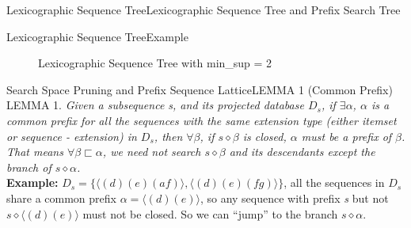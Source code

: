 \documentclass[12pt]{beamer}
\newcommand{\splitline}{\vspace{0.4cm}}
\begin{document}
\begin{frame}{Lexicographic Sequence Tree}{Lexicographic Sequence Tree and Prefix Search Tree}
\end{frame}

\begin{frame}{Lexicographic Sequence Tree}{Example}\label{D-sample}
\begin{figure}
\caption*{Lexicographic Sequence Tree with min\_sup = 2}
\end{figure}
\end{frame}

\begin{frame}{Search Space Pruning and Prefix Sequence Lattice}{LEMMA 1 (Common Prefix)}
LEMMA 1. {\it Given a subsequence s, and its projected database $D_s$, if $\exists\alpha$, $\alpha$ is a common prefix for all the sequences with the same extension type (either itemset or sequence - extension) in $D_s$, then $\forall\beta$, if $s \diamond \beta$ is closed, $\alpha$ must be a prefix of $\beta$. That means $\forall\beta \sqsubset \alpha$, we need not search $s \diamond \beta$ and its descendants except the branch of $s \diamond \alpha$.}\\
\splitline
{\bf Example:} $D_s = \{ \langle (d)(e)(af) \rangle, \langle (d)(e)(fg) \rangle \}$, all the sequences in $D_s$ share a common prefix $\alpha = \langle (d)(e) \rangle$, so any sequence with prefix {\it s} but not $s \diamond \langle (d)(e) \rangle$ must not be closed. So we can ``jump'' to the branch $s \diamond \alpha$.
\end{frame}
\end{document}

